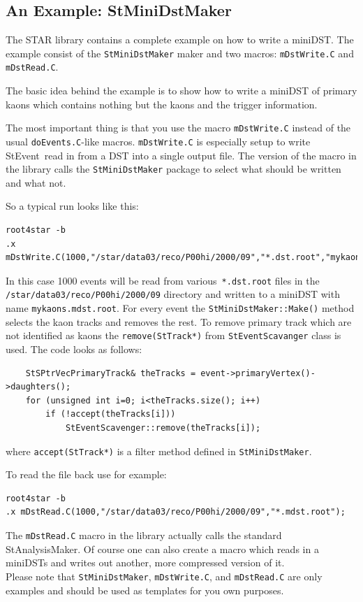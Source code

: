 \documentclass[twoside]{article}
\newcommand{\StEvent}{\textsf{StEvent}}
\begin{document}
\subsection{An Example: StMiniDstMaker}

The STAR library contains a complete example on how to write a miniDST.
The example consist of the \texttt{StMiniDstMaker} maker and two macros:
\texttt{mDstWrite.C} and \texttt{mDstRead.C}.

The basic idea behind the example is to show how to write a miniDST of primary kaons
which contains nothing but the kaons and the trigger information.

The most important thing is that you use the macro \texttt{mDstWrite.C} instead
of the usual \texttt{doEvents.C}-like macros. \texttt{mDstWrite.C} is especially
setup to write \StEvent\ read in from a DST into a single
output file. The version of the macro in the library calls the \texttt{StMiniDstMaker}
package to select what should be written and what not. 

So a typical run looks like this:
\begin{verbatim}
root4star -b
.x mDstWrite.C(1000,"/star/data03/reco/P00hi/2000/09","*.dst.root","mykaons");
\end{verbatim}

In this case 1000 events will be read from various\ \texttt{*.dst.root}
files in the \texttt{/star/data03/reco/P00hi/2000/09} directory and written to
a miniDST with name \texttt{mykaons.mdst.root}.
For every event the \texttt{StMiniDstMaker::Make()} method selects the kaon tracks and removes the
rest. To remove primary track which are not identified as kaons the \texttt{remove(StTrack*)} from
\texttt{StEventScavanger} class is used.
The code looks as follows:
\begin{verbatim}
    StSPtrVecPrimaryTrack& theTracks = event->primaryVertex()->daughters();
    for (unsigned int i=0; i<theTracks.size(); i++)
        if (!accept(theTracks[i]))
            StEventScavenger::remove(theTracks[i]);
\end{verbatim}

where \texttt{accept(StTrack*)} is a filter method defined in \texttt{StMiniDstMaker}.

To read the file back use for example:
\begin{verbatim}
root4star -b
.x mDstRead.C(1000,"/star/data03/reco/P00hi/2000/09","*.mdst.root");
\end{verbatim}

The \texttt{mDstRead.C} macro in the library actually calls the standard StAnalysisMaker.
Of course one can also create a macro which reads in a miniDSTs and writes out
another, more compressed version of it.\\
Please note that \texttt{StMiniDstMaker}, \texttt{mDstWrite.C}, and \texttt{mDstRead.C}
are only examples and should be used as templates for you own purposes.
\end{document}
